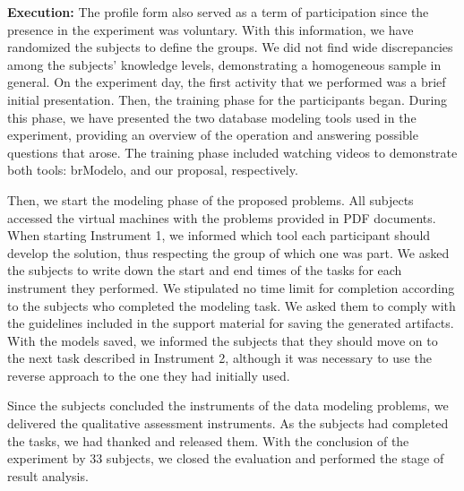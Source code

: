 \textbf{Execution:} 
The profile form also served as a term of participation since the presence in the experiment was voluntary.
With this information, we have randomized the subjects to define the groups.
We did not find wide discrepancies among the subjects' knowledge levels, demonstrating a homogeneous sample in general.
On the experiment day, the first activity that we performed was a brief initial presentation.
Then, the training phase for the participants began.
During this phase, we have presented the two database modeling tools used in the experiment, providing an overview of the operation and answering possible questions that arose.
The training phase included watching videos to demonstrate both tools: brModelo, and our proposal, respectively.

Then, we start the modeling phase of the proposed problems.
All subjects accessed the virtual machines with the problems provided in PDF documents.
When starting Instrument 1, we informed which tool each participant should develop the solution, thus respecting the group of which one was part.
We asked the subjects to write down the start and end times of the tasks for each instrument they performed.
We stipulated no time limit for completion according to the subjects who completed the modeling task. 
We asked them to comply with the guidelines included in the support material for saving the generated artifacts.
With the models saved, we informed the subjects that they should move on to the next task described in Instrument 2, although it was necessary to use the reverse approach to the one they had initially used.

Since the subjects concluded the instruments of the data modeling problems, we delivered the qualitative assessment instruments.
As the subjects had completed the tasks, we had thanked and released them.
With the conclusion of the experiment by 33 subjects, we closed the evaluation and performed the stage of result analysis.

